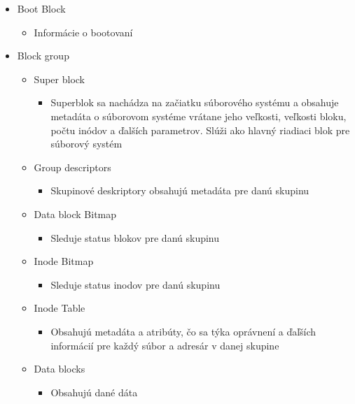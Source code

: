 \documentclass[12pt,oneside,slovak,a4paper]{article}
\begin{document}
\begin{spacing}{1.0}
\begin{itemize}
	\item Boot Block
		\begin{itemize}
			\item Informácie o bootovaní
		\end{itemize}
	\item Block group
		\begin{itemize}
			\item Super block
				\begin{itemize}
					\item Superblok sa nachádza na začiatku súborového systému a obsahuje metadáta o súborovom systéme vrátane jeho veľkosti, veľkosti bloku, počtu inódov a ďalších parametrov. Slúži ako hlavný riadiaci blok pre súborový systém
				\end{itemize}
			\item Group descriptors
				\begin{itemize}
					\item Skupinové deskriptory obsahujú metadáta pre danú skupinu
				\end{itemize}
			\item Data block Bitmap
				\begin{itemize}
					\item Sleduje status blokov pre danú skupinu
				\end{itemize}
			\item Inode Bitmap
				\begin{itemize}
					\item Sleduje status inodov pre danú skupinu
				\end{itemize}
			\item Inode Table
				\begin{itemize}
					\item Obsahujú metadáta a atribúty, čo sa týka oprávnení a ďaľších informácií pre každý súbor a adresár v danej skupine
				\end{itemize}
			\item Data blocks
				\begin{itemize}
					\item Obsahujú dané dáta
				\end{itemize}
		\end{itemize}
\end{itemize}
\end{spacing}
\end{document}
